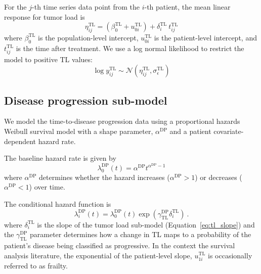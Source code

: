 \documentclass[twocolumn]{bmcart}%
\newcommand{\norm}{\ensuremath{\mathcal{N}}}
\newcommand{\tl}{\ensuremath{\text{TL}}}
\newcommand{\prog}{\ensuremath{\text{DP}}}
\begin{document}
For the $j$-th time series data point from the $i$-th patient, the  mean linear response for tumor load is
\begin{equation}
  \label{eq:tl_res}
  \eta_{ij}^\tl = (\beta_0^\tl + u_{0i}^\tl) + \delta_i^\tl \ t_{ij}^\tl
\end{equation}
where $\beta_0^\tl$ is the population-level intercept, $u_{0i}^\tl$ is the patient-level intercept, and $t_{ij}^\tl$ is the time after treatment.
We use a log normal likelihood to restrict the model to positive TL values:
\begin{equation}
  \label{eq:tl_likelihood}
  \log y_{ij}^\tl \sim \norm(\eta_{ij}^\tl, \sigma_\epsilon^\tl)
\end{equation}

\subsection{Disease progression sub-model}

We model the time-to-disease progression data using a proportional hazards Weibull survival model \citep[e.g.,][]{kleinbaum2012} with a shape parameter, $\alpha^\prog$ and a patient covariate-dependent hazard rate.

The baseline hazard rate is given by
\begin{equation}
  \label{eq:baseline_hazard}
  \lambda_0^\prog(t) = \alpha^\prog t^{\alpha^\prog - 1}
\end{equation}
where $\alpha^\prog$ determines whether the hazard increases ($\alpha^\prog > 1$) or decreases ($\alpha^\prog < 1$) over time.

The conditional hazard function is
\begin{equation}
  \label{eq:covariate_hazard}
  \lambda_i^\prog(t) = \lambda_0^\prog(t) \exp\left(\gamma_\tl^\prog \delta_i^\tl\right) \ .
\end{equation}
where $\delta_i^\tl$ is the slope of the tumor load sub-model (Equation~\ref{eq:tl_slope}) and the $\gamma_\tl^\prog$ parameter determines how a change in TL maps to a probability of the patient's disease being classified as progressive.
In the context the survival analysis literature, the exponential of the patient-level slope, $u_{1i}^\tl$ is occasionally referred to as frailty.
\end{document}
